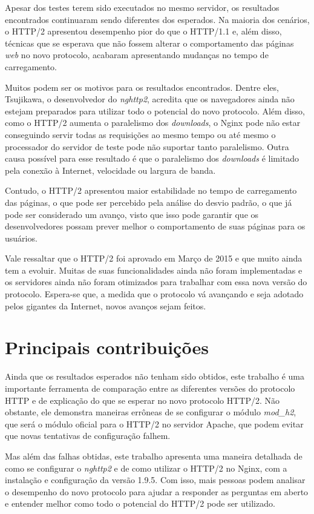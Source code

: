 Apesar dos testes terem sido executados no mesmo servidor, os resultados encontrados continuaram sendo diferentes dos esperados. Na maioria dos cenários, o HTTP/2 apresentou desempenho pior do que o HTTP/1.1 e, além disso, técnicas que se esperava que não fossem alterar o comportamento das páginas \textit{web} no novo protocolo, acabaram apresentando mudanças no tempo de carregamento.

Muitos podem ser os motivos para os resultados encontrados. Dentre eles, Tsujikawa, o desenvolvedor do \textit{nghttp2}, acredita que os navegadores ainda não estejam preparados para utilizar todo o potencial do novo protocolo. Além disso, como o HTTP/2 aumenta o paralelismo dos \textit{downloads}, o Nginx pode não estar conseguindo servir todas as requisições ao mesmo tempo ou até mesmo o processador do servidor de teste pode não suportar tanto paralelismo. Outra causa possível para esse resultado é que o paralelismo dos \textit{downloads} é limitado pela conexão à Internet, velocidade ou largura de banda.

Contudo, o HTTP/2 apresentou maior estabilidade no tempo de carregamento das páginas, o que pode ser percebido pela análise do desvio padrão, o que já pode ser considerado um avanço, visto que isso pode garantir que os desenvolvedores possam prever melhor o comportamento de suas páginas para os usuários.

Vale ressaltar que o HTTP/2 foi aprovado em Março de 2015 e que muito ainda tem a evoluir. Muitas de suas funcionalidades ainda não foram implementadas e os servidores ainda não foram otimizados para trabalhar com essa nova versão do protocolo. Espera-se que, a medida que o protocolo vá avançando e seja adotado pelos gigantes da Internet, novos avanços sejam feitos.

\section{Principais contribuições}
\label{principaiscontribuicoes}

Ainda que os resultados esperados não tenham sido obtidos, este trabalho é uma importante ferramenta de comparação entre as diferentes versões do protocolo HTTP e de explicação do que se esperar no novo protocolo HTTP/2. Não obstante, ele demonstra maneiras errôneas de se configurar o módulo \textit{mod\_h2}, que será o módulo oficial para o HTTP/2 no servidor Apache, que podem evitar que novas tentativas de configuração falhem.

Mas além das falhas obtidas, este trabalho apresenta uma maneira detalhada de como se configurar o \textit{nghttp2} e de como utilizar o HTTP/2 no Nginx, com a instalação e configuração da versão 1.9.5. Com isso, mais pessoas podem analisar o desempenho do novo protocolo para ajudar a responder as perguntas em aberto e entender melhor como todo o potencial do HTTP/2 pode ser utilizado.



